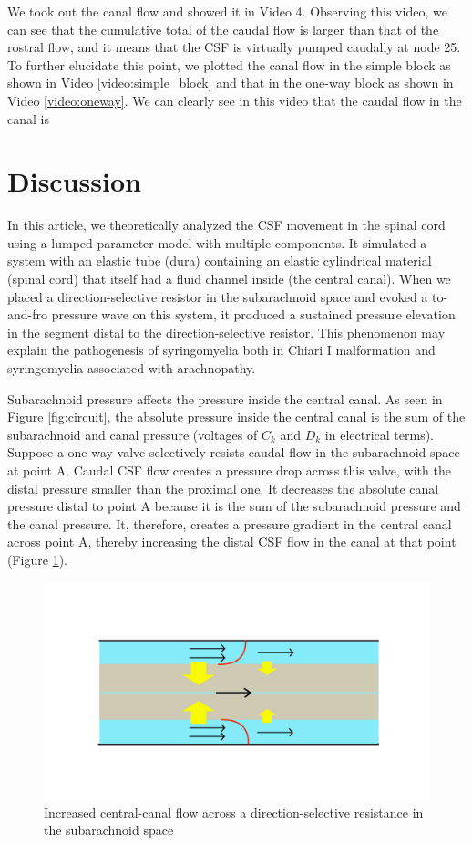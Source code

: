 \documentclass[fleqn,10pt]{wlscirep}
\begin{document}
We took out the canal flow and showed it in Video 4.  Observing this video,
we can see that the cumulative total of the caudal flow is larger than that
of the rostral flow, and it means that the CSF is virtually pumped caudally
at node 25. To further elucidate this point, we plotted the canal flow in
the simple block as shown in Video \ref{video:simple_block} and that in the
one-way block as shown in Video \ref{video:oneway}. We can clearly see in
this video that the caudal flow in the canal is 


\section*{Discussion}

In this article, we theoretically analyzed the CSF movement in the spinal
cord using a lumped parameter model with multiple components. It simulated
a system with an elastic tube (dura) containing an elastic cylindrical
material (spinal cord) that itself had a fluid channel inside (the central
canal). When we placed a direction-selective resistor in the subarachnoid
space and evoked a to-and-fro pressure wave on this system, it produced a
sustained pressure elevation in the segment distal to the
direction-selective resistor. This phenomenon may explain the pathogenesis
of syringomyelia both in Chiari I malformation and syringomyelia associated
with arachnopathy.

Subarachnoid pressure affects the pressure inside the central canal. As
seen in Figure \ref{fig:circuit}, the absolute pressure inside the central
canal is the sum of the subarachnoid and canal pressure (voltages of $C_k$
and $D_k$ in electrical terms). Suppose a one-way valve selectively resists
caudal flow in the subarachnoid space at point A. Caudal CSF flow creates a
pressure drop across this valve, with the distal pressure smaller than the
proximal one. It decreases the absolute canal pressure distal to point A
because it is the sum of the subarachnoid pressure and the canal pressure.
It, therefore, creates a pressure gradient in the central canal across
point A, thereby increasing the distal CSF flow in the canal at that point
(Figure \ref{fig:pump_close}).

\begin{figure}[hbt]
    \centering
    \includegraphics[width=\textwidth]{pumping_mechanism_close.jpg}
    \caption{Increased central-canal flow across a direction-selective
    resistance in the subarachnoid space}
    \label{fig:pump_close}
\end{figure}
\end{document}
